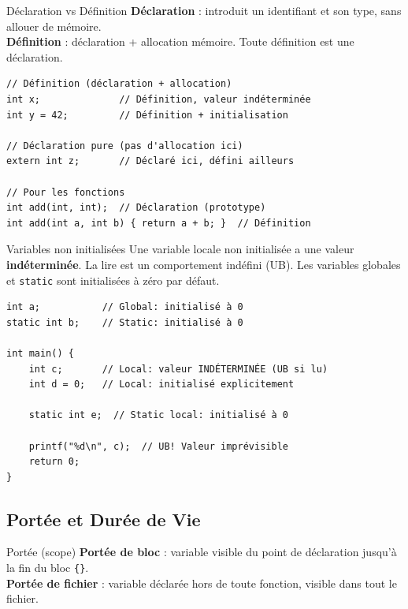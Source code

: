 \documentclass[10pt,a4paper]{article}
\begin{document}
\begin{definitionbox}{Déclaration vs Définition}
\textbf{Déclaration} : introduit un identifiant et son type, sans allouer de mémoire.\\
\textbf{Définition} : déclaration + allocation mémoire. Toute définition est une déclaration.
\end{definitionbox}

\begin{lstlisting}[caption={Déclaration et définition de variables}]
// Définition (déclaration + allocation)
int x;              // Définition, valeur indéterminée
int y = 42;         // Définition + initialisation

// Déclaration pure (pas d'allocation ici)
extern int z;       // Déclaré ici, défini ailleurs

// Pour les fonctions
int add(int, int);  // Déclaration (prototype)
int add(int a, int b) { return a + b; }  // Définition
\end{lstlisting}

\begin{warningbox}{Variables non initialisées}
Une variable locale non initialisée a une valeur \textbf{indéterminée}. La lire est un comportement indéfini (UB). Les variables globales et \texttt{static} sont initialisées à zéro par défaut.
\end{warningbox}

\begin{lstlisting}[caption={Initialisation}]
int a;           // Global: initialisé à 0
static int b;    // Static: initialisé à 0

int main() {
    int c;       // Local: valeur INDÉTERMINÉE (UB si lu)
    int d = 0;   // Local: initialisé explicitement
    
    static int e;  // Static local: initialisé à 0
    
    printf("%d\n", c);  // UB! Valeur imprévisible
    return 0;
}
\end{lstlisting}

\subsection{Portée et Durée de Vie}

\begin{definitionbox}{Portée (scope)}
\textbf{Portée de bloc} : variable visible du point de déclaration jusqu'à la fin du bloc \texttt{\{\}}.\\
\textbf{Portée de fichier} : variable déclarée hors de toute fonction, visible dans tout le fichier.
\end{definitionbox}
\end{document}
